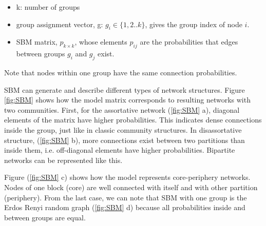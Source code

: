 \begin{itemize}
	\item k: number of groups
	\item group assignment vector, g: $g_i \in\{1,2..k\}$, gives the group index of node $i$.
	\item SBM matrix, $p_{k \times k}$, whose elements $p_{ij}$ are the probabilities that edges between groups $g_i$ and $g_j$ exist.
\end{itemize}

Note that nodes within one group have the same connection probabilities.

SBM can generate and describe different types of network structures. Figure \ref{fig:SBM} \cite{userguide} shows how the model matrix corresponds to resulting networks with two communities. First, for the assortative network (\ref{fig:SBM} a), diagonal elements of the matrix have higher probabilities. This indicates dense connections inside the group, just like in classic community structures. In disassortative structure, (\ref{fig:SBM} b), more connections exist between two partitions than inside them, i.e. off-diagonal elements have higher probabilities. Bipartite networks can be represented like this. 

Figure (\ref{fig:SBM} c) shows how the model represents core-periphery networks. Nodes of one block (core) are well connected with itself and with other partition (periphery). From the last case, we can note that SBM with one group is the Erdos Renyi random graph (\ref{fig:SBM} d) because all probabilities inside and between groups are equal.

